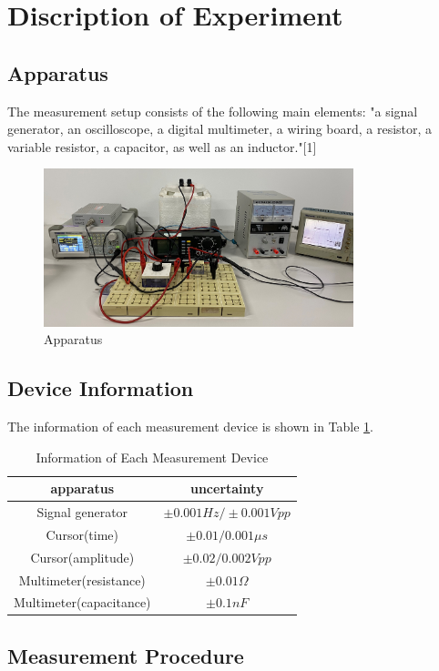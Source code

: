 \documentclass[12pt,a4paper]{article}
\begin{document}
\section{Discription of Experiment}
\subsection{Apparatus}
The measurement setup consists of the following main elements: "a signal generator, an oscilloscope, a digital multimeter, a wiring board, a resistor, a variable resistor, a capacitor, as well as an inductor."[1]
\begin{figure}[H]
    \centering
    \includegraphics[width=9cm]{apparatus.jpg}
    \caption{Apparatus}
\end{figure}

\subsection{Device Information}
The information of each measurement device is shown in Table \ref{information}.

\begin{table}[H]
    \centering
    \begin{tabular}{|c|c|}
    \hline
    apparatus & uncertainty \\ \hline
    Signal generator & $\pm 0.001Hz/\pm 0.001 Vpp$ \\ \hline
    Cursor(time) & $\pm 0.01/0.001\mu s$\\ \hline
    Cursor(amplitude) & $\pm 0.02/0.002 Vpp$\\ \hline
    Multimeter(resistance)  & $\pm 0.01\Omega$\\ \hline
    Multimeter(capacitance) & $\pm 0.1nF$\\ \hline
    \end{tabular}
    \caption{Information of Each Measurement Device}
    \label{information}
\end{table}

\subsection{Measurement Procedure}
\end{document}
